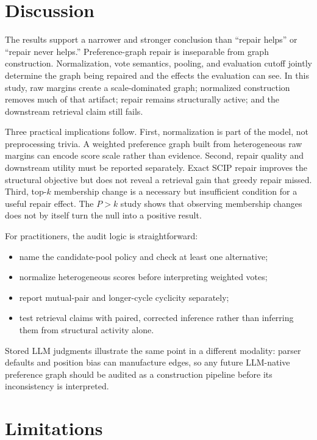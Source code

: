 \documentclass[acmsmall,anonymous,review]{acmart}
\begin{document}
\section{Discussion}
\label{sec:discussion}

The results support a narrower and stronger conclusion than ``repair helps''
or ``repair never helps.'' Preference-graph repair is inseparable from graph
construction. Normalization, vote semantics, pooling, and evaluation cutoff
jointly determine the graph being repaired and the effects the evaluation
can see. In this study, raw margins create a scale-dominated graph;
normalized construction removes much of that artifact; repair remains
structurally active; and the downstream retrieval claim still fails.

Three practical implications follow. First, normalization is part of the
model, not preprocessing trivia. A weighted preference graph built from
heterogeneous raw margins can encode score scale rather than evidence.
Second, repair quality and downstream utility must be reported separately.
Exact SCIP repair improves the structural objective but does not reveal a
retrieval gain that greedy repair missed. Third, top-$k$ membership change
is a necessary but insufficient condition for a useful repair effect. The
$P>k$ study shows that observing membership changes does not by itself turn
the null into a positive result.

For practitioners, the audit logic is straightforward:
\begin{itemize}
  \item name the candidate-pool policy and check at least one alternative;
  \item normalize heterogeneous scores before interpreting weighted votes;
  \item report mutual-pair and longer-cycle cyclicity separately;
  \item test retrieval claims with paired, corrected inference rather than
    inferring them from structural activity alone.
\end{itemize}
Stored LLM judgments illustrate the same point in a different modality:
parser defaults and position bias can manufacture edges, so any future
LLM-native preference graph should be audited as a construction pipeline
before its inconsistency is interpreted.

\section{Limitations}
\label{sec:threats}
\end{document}
